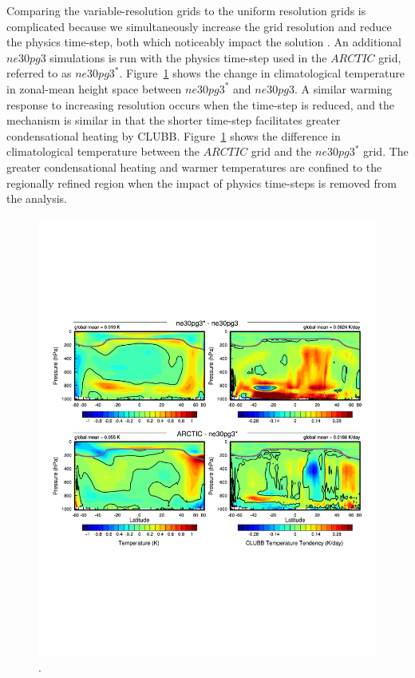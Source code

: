\documentclass[draft]{agujournal2019}
\begin{document}
Comparing the variable-resolution grids to the uniform resolution grids is complicated because we simultaneously increase the grid resolution and reduce the physics time-step, both which noticeably impact the solution \cite{W2008TELLUS}. An additional $ne30pg3$ simulations is run with the physics time-step used in the $ARCTIC$ grid, referred to as $ne30pg3^{*}$. Figure~\ref{fig:dT-hires} shows the change in climatological temperature in zonal-mean height space between $ne30pg3^{*}$ and $ne30pg3$. A similar warming response to increasing resolution occurs when the time-step is reduced, and the mechanism is similar in that the shorter time-step facilitates greater condensational heating by CLUBB. Figure~\ref{fig:dT-hires} shows the difference in climatological temperature between the $ARCTIC$ grid and the $ne30pg3^{*}$ grid. The greater condensational heating and warmer temperatures are confined to the regionally refined region when the impact of physics time-steps is removed from the analysis.

\begin{figure}[t]
\begin{center}
         \includegraphics[width=130mm]{figs/temp_dhgt_panel_STEND_CLUBB-hires.pdf}
\end{center}
\caption{.}
\label{fig:dT-hires}
\end{figure}
\end{document}
